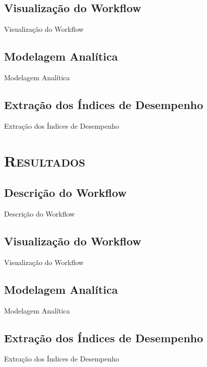 \documentclass[xcolor=x11names,compress]{beamer}
\renewcommand{\(}{\begin{columns}}
\renewcommand{\)}{\end{columns}}
\newcommand{\<}[1]{\begin{column}{#1}}
\renewcommand{\>}{\end{column}}
\begin{document}
    \subsection{Visualização do Workflow}
        \begin{frame}{Visualização do Workflow}

        \end{frame}

    \subsection{Modelagem Analítica}
        \begin{frame}{Modelagem Analítica}

        \end{frame}

    \subsection{Extração dos Índices de Desempenho}
        \begin{frame}{Extração dos Índices de Desempenho}

        \end{frame}

\section{\scshape Resultados}

    \subsection{Descrição do Workflow}
        \begin{frame}{Descrição do Workflow}

        \end{frame}

    \subsection{Visualização do Workflow}
        \begin{frame}{Visualização do Workflow}

        \end{frame}

    \subsection{Modelagem Analítica}
        \begin{frame}{Modelagem Analítica}

        \end{frame}

    \subsection{Extração dos Índices de Desempenho}
        \begin{frame}{Extração dos Índices de Desempenho}

        \end{frame}
\end{document}
